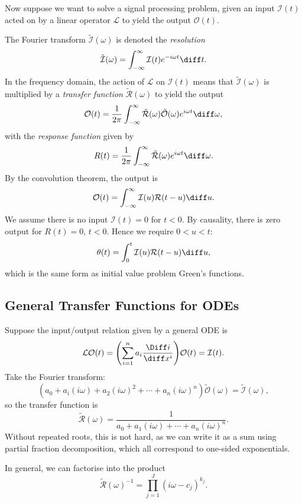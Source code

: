 \documentclass[12pt]{article}
\begin{document}
Now suppose we want to solve a signal processing problem, given an input $\mathcal{I}(t)$ acted on by a linear operator $\mathcal{L}$ to yield the output $\mathcal{O}(t)$.

The Fourier transform $\tilde{\mathcal{I}}(\omega)$ is denoted the \textit{resolution}
\[
	\tilde{\mathcal{I}}(\omega) = \int_{-\infty}^{\infty} \mathcal{I}(t) e^{-i \omega t}\diff t
.\]
In the frequency domain, the action of $\mathcal{L}$ on $\mathcal{I}(t)$ means that $\tilde{\mathcal{I}}(\omega)$ is multiplied by a \textit{transfer function} $\tilde{\mathcal{R}}(\omega)$ to yield the output
\[
	\mathcal{O}(t) = \frac{1}{2 \pi} \int_{-\infty}^{\infty} \tilde{\mathcal{R}}(\omega) \tilde{\mathcal{O}}(\omega) e^{i\omega t} \diff \omega
,\]
with the \textit{response function} given by
\[
	R(t) = \frac{1}{2\pi} \int_{-\infty}^{\infty} \tilde{\mathcal{R}}(\omega) e^{i \omega t}\diff \omega
.\]
By the convolution theorem, the output is
\[
	\mathcal{O}(t) = \int_{-\infty}^{\infty} \mathcal{I}(u) \mathcal{R}(t - u) \diff u
.\]
We assume there is no input $\mathcal{I}(t) = 0$ for $t < 0$. By causality, there is zero output for $R(t) = 0$, $t < 0$. Hence we require $0 < u < t$:
\[
	\theta(t) = \int_{0}^{t} \mathcal{I}(u) \mathcal{R}(t - u) \diff u
,\]
which is the same form as initial value problem Green's functions.

\subsection{General Transfer Functions for ODEs}%
\label{sub:general_transfer_functions_for_odes}

Suppose the input/output relation given by a general ODE is
\[
	\mathcal{L}\mathcal{O}(t) = \Biggl( \sum_{i = 1}^{n} a_i \frac{\Diff i}{\diff x^{i}} \Biggr) \mathcal{O}(t) = \mathcal{I}(t)
.\]
Take the Fourier transform:
\[
	(a_0 + a_i(i\omega) + a_2 (i \omega)^2 + \cdots + a_n (i \omega)^{n}) \tilde{\mathcal{O}}(\omega) = \tilde{\mathcal{I}}(\omega)
,\]
so the transfer function is
\[
	\tilde{\mathcal{R}}(\omega) = \frac{1}{a_0 + a_1(i \omega) + \cdots + a_n (i \omega)^{n}}
.\]
Without repeated roots, this is not hard, as we can write it as a sum using partial fraction decomposition, which all correspond to one-sided exponentials.

In general, we can factorise into the product
\[
	\tilde{\mathcal{R}}(\omega)^{-1} = \prod_{j=1}^{J}(i \omega - c_j)^{k_j}
.\]
\end{document}

